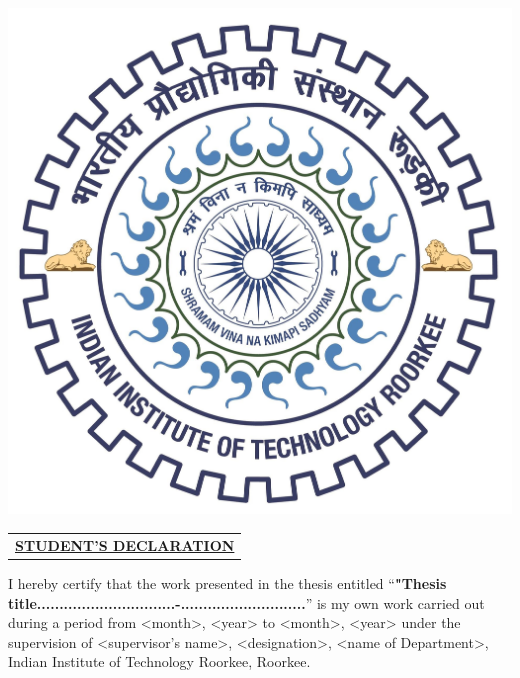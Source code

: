\cleardoublepage
%
 \begin{minipage}{0.13\textwidth}
    \hspace*{-1cm}
    \includegraphics[width=\dimexpr\textwidth\relax]{image/iitrlogo.jpg} %
    
  \end{minipage}
 \begin{minipage}{0.9\textwidth}
   \onehalfspacing
  \end{minipage}
\begin{center}
\begin{tabular}{ c }
    \centering
	\fontsize{14}{16.8} \bfseries \MakeUppercase{\underline{Student's Declaration}}\\
\end{tabular}
\end{center}
%
\doublespacing
\noindent
\justifying
I hereby certify that the work presented in the thesis entitled “\textbf{"Thesis title...............................\--............................}” is my own work carried out during a period from <month>, <year> to <month>, <year> under the supervision of <supervisor's name>, <designation>, <name of Department>, Indian Institute of Technology Roorkee, Roorkee. 

